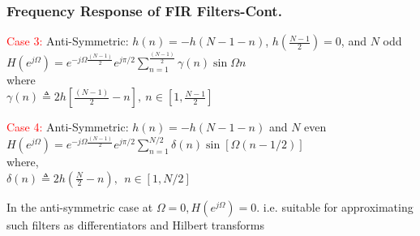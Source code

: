 \documentclass[mathserif, 10pt]{beamer} %
\begin{document}
\frame
{

\normalsize
\frametitle{Frequency Response of FIR Filters-Cont.}

\textcolor{red}{Case 3:} Anti-Symmetric:  $h(n) = -h(N-1-n)$, $h(\frac{N-1}{2})=0$, and  $N$ odd \\ \vspace{.1in}
$H(e^{j\Omega}) = e^{-j\Omega \frac{(N-1)}{2}}e^{j\pi/2}\sum\limits_{n=1}^{\frac{(N-1)}{2}} \gamma(n) \sin{\Omega n}$\\
where\\
$\gamma(n) \triangleq 2h\left[ \frac{(N-1)}{2}-n\right],~n\in[1,\frac{N-1}{2}]$\\ \vspace{.2in}

\textcolor{red}{Case 4:} Anti-Symmetric:  $h(n) = -h(N-1-n)$ and $N$ even \\ \vspace{.1in}
$H(e^{j\Omega}) = e^{-j\Omega\frac{(N-1)}{2}}e^{j\pi/2}\sum\limits_{n=1}^{N/2} \delta(n) \sin{[\Omega(n-1/2)]}$\\
where,\\
$\delta(n) \triangleq 2h(\frac{N}{2}-n), ~~n\in[1,N/2]$ \\ \vspace{.1in}

In the anti-symmetric case at $\Omega = 0, H(e^{j\Omega}) = 0$.  i.e. suitable for approximating such filters as differentiators and Hilbert transforms

}
\end{document}
